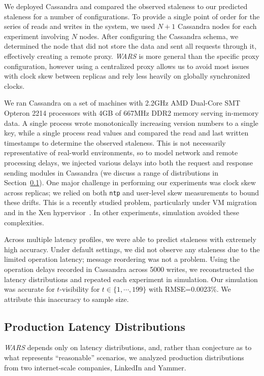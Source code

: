 \documentclass{vldb}
\begin{document}
We deployed Cassandra and compared the observed staleness to our
predicted staleness for a number of configurations.  To provide a
single point of order for the series of reads and writes in the
system, we used $N+1$ Cassandra nodes for each experiment involving
$N$ nodes.  After configuring the Cassandra schema, we determined the
node that did not store the data and sent all requests through it,
effectively creating a remote proxy.  \textit{WARS} is more general
than the specific proxy configuration, however using a centralized
proxy allows us to avoid most issues with clock skew between replicas
and rely less heavily on globally synchronized clocks.

We ran Cassandra on a set of machines with 2.2GHz AMD Dual-Core SMT
Opteron 2214 processors with 4GB of 667MHz DDR2 memory serving
in-memory data.  A single process wrote monotonically increasing
version numbers to a single key, while a single process read values
and compared the read and last written timestamps to determine the
observed staleness.  This is not necessarily representative of
real-world environments, so to model network and remote processing
delays, we injected various delays into both the request and response
sending modules in Cassandra (we discuss a range of distributions in
Section~\ref{sec:latencies}).  One major challenge in performing our
experiments was clock skew across replicas; we relied on both
\texttt{ntp} and user-level skew measurements to bound these drifts.
This is a recently studied problem, particularly under VM migration
and in the Xen hypervisor~\cite{time-virt}. In other experiments,
simulation avoided these complexities.

Across multiple latency profiles, we were able to predict staleness
with extremely high accuracy. Under default settings, we did not
observe any staleness due to the limited operation latency; message
reordering was not a problem.  Using the operation delays recorded in
Cassandra across 5000 writes, we reconstructed the latency
distributions and repeated each experiment in simulation.  Our
simulation was accurate for $t$-visibility for $t\in\{1,\cdots,199\}$
with RMSE=0.0023\%.  We attribute this inaccuracy to sample
size.


\subsection{Production Latency Distributions}
\label{sec:latencies}

\textit{WARS} depends only on latency distributions, and, rather than
conjecture as to what represents ``reasonable'' scenarios, we analyzed
production distributions from two internet-scale companies, LinkedIn
and Yammer.
\end{document}
